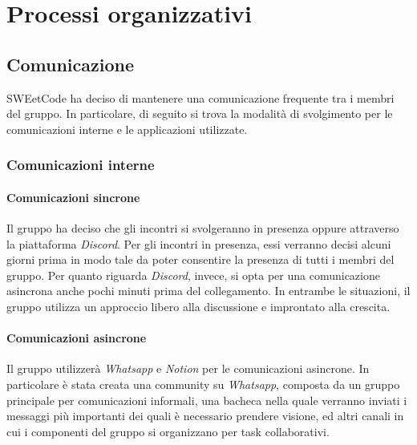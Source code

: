 \documentclass[10pt, a4paper]{article}
\begin{document}
\newpage
\section{Processi organizzativi}
\subsection{Comunicazione}
SWEetCode ha deciso di mantenere una comunicazione frequente tra i membri del gruppo. In particolare, di seguito si trova la modalità di svolgimento per le comunicazioni interne e le applicazioni utilizzate.
\subsubsection{Comunicazioni interne}
\paragraph{Comunicazioni sincrone}Il gruppo ha deciso che gli incontri si svolgeranno  in presenza oppure attraverso la piattaforma \textit{Discord}. Per gli incontri in presenza, essi verranno decisi alcuni giorni prima in modo tale da poter consentire la presenza di tutti i membri del gruppo. Per quanto riguarda \textit{Discord}, invece, si opta per una comunicazione asincrona anche pochi minuti prima del collegamento. In entrambe le situazioni, il gruppo utilizza un approccio libero alla discussione e improntato alla crescita.

\paragraph{Comunicazioni asincrone}Il gruppo utilizzerà \textit{Whatsapp} e \textit{Notion} per le comunicazioni asincrone. In particolare è stata creata una community su \textit{Whatsapp}, composta da un gruppo principale per comunicazioni informali, una bacheca nella quale verranno inviati i messaggi più importanti dei quali è necessario prendere visione, ed altri canali in cui i componenti del gruppo si organizzano per task collaborativi.
\end{document}
